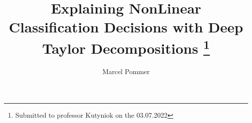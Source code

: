 


\usepackage{amsfonts}
\usepackage{graphicx}
\usepackage{epstopdf}
\usepackage{multirow}
\usepackage{hyperref}
\usepackage{algorithmic}
\ifpdf
\else
\fi

\newcommand{\creflastconjunction}{, and~}



\title{Explaining NonLinear Classification Decisions with Deep Taylor Decompositions
\thanks{Submitted to professor Kutyniok on the 03.07.2022}}

\author{Marcel Pommer}

\usepackage{amsopn}
\DeclareMathOperator{\diag}{diag}


